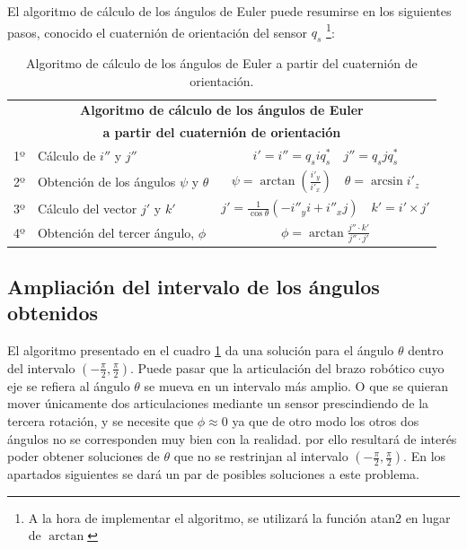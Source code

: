 \documentclass[12pt, a4paper]{report}
\begin{document}
El algoritmo de cálculo de los ángulos de Euler puede resumirse en los siguientes pasos, conocido el cuaternión de orientación del sensor $q_s$ \footnote{A la hora de implementar el algoritmo, se utilizará la función atan2 en lugar de $\arctan$}:

\begin{table}[h]
	\center
	\begin{tabular}{|l|l|c|}
	\hline
	\multicolumn{3}{|c|}{\textbf{Algoritmo de cálculo de los ángulos de Euler}}\\
	\multicolumn{3}{|c|}{\textbf{a partir del cuaternión de orientación}}\\
	\hline
	1º & Cálculo de $i''$ y $j''$ & $ i' = i'' = q_siq_s^* \quad j'' = q_sjq_s^*$  \\
	2º & Obtención de los ángulos $\psi$ y $\theta$ & $ \psi = \arctan \left( \displaystyle\frac{i'_y}{i'_x} \right) \quad \theta = \arcsin i'_z $ \\
	3º & Cálculo del vector $j'$ y $k'$ & $ j' = \displaystyle\frac{1}{\cos\theta} \left( - i''_y i + i''_x j \right) \quad k' = i' \times j' $ \\
	4º & Obtención del tercer ángulo, $\phi$ & $ \phi = \arctan \displaystyle\frac{j'' \cdot k'}{j'' \cdot j'} $ \\
	\hline
	\end{tabular}

	\caption{Algoritmo de cálculo de los ángulos de Euler a partir del cuaternión de orientación.}
	\label{tab:algoritmo_angulos_euler}

\end{table}

\subsection{Ampliación del intervalo de los ángulos obtenidos}

El algoritmo presentado en el cuadro \ref{tab:algoritmo_angulos_euler} da una solución para el ángulo $\theta$ dentro del intervalo $\left(-\frac{\pi}{2}, \frac{\pi}{2} \right)$. Puede pasar que la articulación del brazo robótico cuyo eje se refiera al ángulo $\theta$ se mueva en un intervalo más amplio. O que se quieran mover únicamente dos articulaciones mediante un sensor prescindiendo de la tercera rotación, y se necesite que $\phi \approx 0$ ya que de otro modo los otros dos ángulos no se corresponden muy bien con la realidad. por ello resultará de interés poder obtener soluciones de $\theta$ que no se restrinjan al intervalo $\left(-\frac{\pi}{2}, \frac{\pi}{2} \right)$. En los apartados siguientes se dará un par de posibles soluciones a este problema.
\end{document}
